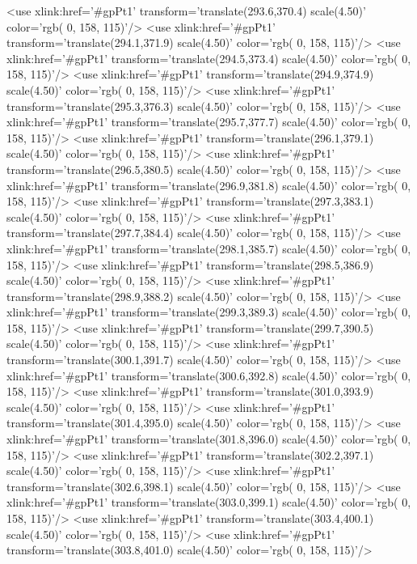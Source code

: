 	<use xlink:href='#gpPt1' transform='translate(293.6,370.4) scale(4.50)' color='rgb(  0, 158, 115)'/>
	<use xlink:href='#gpPt1' transform='translate(294.1,371.9) scale(4.50)' color='rgb(  0, 158, 115)'/>
	<use xlink:href='#gpPt1' transform='translate(294.5,373.4) scale(4.50)' color='rgb(  0, 158, 115)'/>
	<use xlink:href='#gpPt1' transform='translate(294.9,374.9) scale(4.50)' color='rgb(  0, 158, 115)'/>
	<use xlink:href='#gpPt1' transform='translate(295.3,376.3) scale(4.50)' color='rgb(  0, 158, 115)'/>
	<use xlink:href='#gpPt1' transform='translate(295.7,377.7) scale(4.50)' color='rgb(  0, 158, 115)'/>
	<use xlink:href='#gpPt1' transform='translate(296.1,379.1) scale(4.50)' color='rgb(  0, 158, 115)'/>
	<use xlink:href='#gpPt1' transform='translate(296.5,380.5) scale(4.50)' color='rgb(  0, 158, 115)'/>
	<use xlink:href='#gpPt1' transform='translate(296.9,381.8) scale(4.50)' color='rgb(  0, 158, 115)'/>
	<use xlink:href='#gpPt1' transform='translate(297.3,383.1) scale(4.50)' color='rgb(  0, 158, 115)'/>
	<use xlink:href='#gpPt1' transform='translate(297.7,384.4) scale(4.50)' color='rgb(  0, 158, 115)'/>
	<use xlink:href='#gpPt1' transform='translate(298.1,385.7) scale(4.50)' color='rgb(  0, 158, 115)'/>
	<use xlink:href='#gpPt1' transform='translate(298.5,386.9) scale(4.50)' color='rgb(  0, 158, 115)'/>
	<use xlink:href='#gpPt1' transform='translate(298.9,388.2) scale(4.50)' color='rgb(  0, 158, 115)'/>
	<use xlink:href='#gpPt1' transform='translate(299.3,389.3) scale(4.50)' color='rgb(  0, 158, 115)'/>
	<use xlink:href='#gpPt1' transform='translate(299.7,390.5) scale(4.50)' color='rgb(  0, 158, 115)'/>
	<use xlink:href='#gpPt1' transform='translate(300.1,391.7) scale(4.50)' color='rgb(  0, 158, 115)'/>
	<use xlink:href='#gpPt1' transform='translate(300.6,392.8) scale(4.50)' color='rgb(  0, 158, 115)'/>
	<use xlink:href='#gpPt1' transform='translate(301.0,393.9) scale(4.50)' color='rgb(  0, 158, 115)'/>
	<use xlink:href='#gpPt1' transform='translate(301.4,395.0) scale(4.50)' color='rgb(  0, 158, 115)'/>
	<use xlink:href='#gpPt1' transform='translate(301.8,396.0) scale(4.50)' color='rgb(  0, 158, 115)'/>
	<use xlink:href='#gpPt1' transform='translate(302.2,397.1) scale(4.50)' color='rgb(  0, 158, 115)'/>
	<use xlink:href='#gpPt1' transform='translate(302.6,398.1) scale(4.50)' color='rgb(  0, 158, 115)'/>
	<use xlink:href='#gpPt1' transform='translate(303.0,399.1) scale(4.50)' color='rgb(  0, 158, 115)'/>
	<use xlink:href='#gpPt1' transform='translate(303.4,400.1) scale(4.50)' color='rgb(  0, 158, 115)'/>
	<use xlink:href='#gpPt1' transform='translate(303.8,401.0) scale(4.50)' color='rgb(  0, 158, 115)'/>
